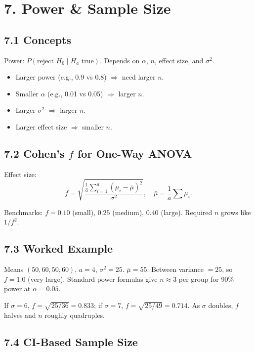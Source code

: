 \documentclass[9pt,letterpaper]{article}
\begin{document}
\section{7. Power \& Sample Size}

\subsection{7.1 Concepts}

Power: $P(\text{reject }H_0 \mid H_a\text{ true})$. Depends on $\alpha$, $n$, effect size, and $\sigma^2$.

\begin{itemize}
    \item Larger power (e.g., 0.9 vs 0.8) $\Rightarrow$ need larger $n$.
    \item Smaller $\alpha$ (e.g., 0.01 vs 0.05) $\Rightarrow$ larger $n$.
    \item Larger $\sigma^2$ $\Rightarrow$ larger $n$.
    \item Larger effect size $\Rightarrow$ smaller $n$.
\end{itemize}

\subsection{7.2 Cohen's $f$ for One-Way ANOVA}

Effect size:
\[
f=\sqrt{\frac{\frac{1}{a}\sum_{i=1}^a(\mu_i-\bar{\mu})^2}{\sigma^2}},\quad \bar{\mu}=\frac{1}{a}\sum\mu_i.
\]

Benchmarks: $f=0.10$ (small), $0.25$ (medium), $0.40$ (large). Required $n$ grows like $1/f^2$.

\subsection{7.3 Worked Example}

Means $(50,60,50,60)$, $a=4$, $\sigma^2=25$. $\bar{\mu}=55$. Between variance $=25$, so $f=1.0$ (very large). Standard power formulas give $n\approx3$ per group for 90\% power at $\alpha=0.05$.

If $\sigma=6$, $f=\sqrt{25/36}=0.833$; if $\sigma=7$, $f=\sqrt{25/49}=0.714$. As $\sigma$ doubles, $f$ halves and $n$ roughly quadruples.

\subsection{7.4 CI-Based Sample Size}
\end{document}
